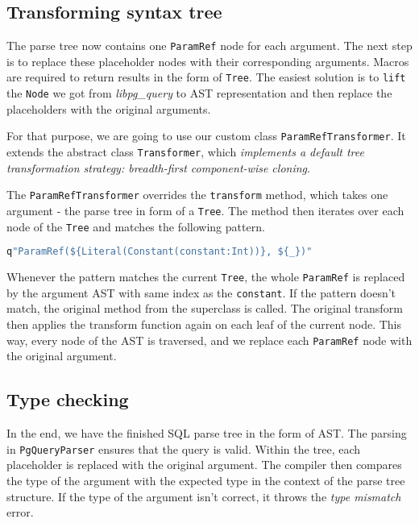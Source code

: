 \subsection{Transforming syntax tree}
The parse tree now contains one \texttt{ParamRef} node for each argument. The next step is to replace these placeholder nodes with their corresponding arguments. Macros are required to return results in the form of \texttt{Tree}. The easiest solution is to \texttt{lift} the \texttt{Node} we got from \textit{libpg\_query} to AST representation and then replace the placeholders with the original arguments. 

For that purpose, we are going to use our custom class \texttt{ParamRefTransformer}. It extends the abstract class \texttt{Transformer}, which \textit{implements a default tree transformation strategy: breadth-first component-wise cloning}.\cite{Transformer} 

The \texttt{ParamRefTransformer} overrides the \texttt{transform} method, which takes one argument - the parse tree in form of a \texttt{Tree}. The method then iterates over each node of the \texttt{Tree} and matches the following pattern.
\begin{lstlisting}[language=scala, basicstyle=\ttfamily, showstringspaces=false, caption={Pattern of the AST of \texttt{ParamRef} node.}, xleftmargin=.05in]
q"ParamRef(${Literal(Constant(constant:Int))}, ${_})"
\end{lstlisting}
Whenever the pattern matches the current \texttt{Tree}, the whole \texttt{ParamRef} is replaced by the argument AST with same index as the \texttt{constant}. If the pattern doesn't match, the original method from the superclass is called. The original transform then applies the transform function again on each leaf of the current node.
This way, every node of the AST is traversed, and we replace each \texttt{ParamRef} node with the original argument.

\subsection{Type checking}
In the end, we have the finished SQL parse tree in the form of AST. 
The parsing in \texttt{PgQueryParser} ensures that the query is valid.
Within the tree, each placeholder is replaced with the original argument. The compiler then compares the type of the argument with the expected type in the context of the parse tree structure. If the type of the argument isn't correct, it throws the \textit{type mismatch} error.

